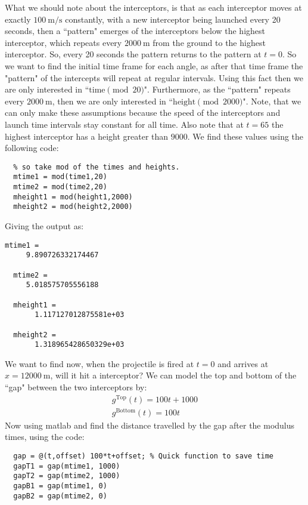 \documentclass[12pt]{article}
\begin{document}
What we should note about the interceptors, is that as each interceptor moves at exactly $\SI{100}{\meter\per\second}$ constantly, with a new interceptor being launched every 20 seconds, then a ``pattern" emerges of the interceptors below the highest interceptor, which repeats every $\SI{2000}{\meter}$ from the ground to the highest interceptor. So, every 20 seconds the pattern returns to the pattern at $t=0$. So we want to find the initial time frame for each angle, as after that time frame the "pattern" of the intercepts will repeat at regular intervals. Using this fact then we are only interested in ``$\text{time}\pmod{20}$". Furthermore, as the ``pattern" repeats every $\SI{2000}{\meter}$, then we are only interested in ``$\text{height}\pmod{2000}$". Note, that we can only make these assumptions because the speed of the interceptors and launch time intervals stay constant for all time. Also note that at $t=65$ the highest interceptor has a height greater than $9000$.  We find these values using the following code:
\begin{lstlisting}[title={Modulus of height and time}]
  % The pattern of interceptors reset every 20 seconds, and every 2000 meters
  % so take mod of the times and heights.
  mtime1 = mod(time1,20)
  mtime2 = mod(time2,20)
  mheight1 = mod(height1,2000)
  mheight2 = mod(height2,2000)
\end{lstlisting}
Giving the output as:
\begin{lstlisting}[title={Output of modulus}]
  mtime1 =
     9.890726332174467

  mtime2 =
     5.018575705556188

  mheight1 =
       1.117127012875581e+03

  mheight2 =
       1.318965428650329e+03
\end{lstlisting}
We want to find now, when the projectile is fired at $t=0$ and arrives at $x=\SI{12000}{\meter}$, will it hit a interceptor? We can model the top and bottom of the ``gap" between the two interceptors by:
\begin{gather*}
  g^\text{Top}(t) = 100t+1000 \\
  g^\text{Bottom}(t) = 100t
\end{gather*}
Now using matlab and find the distance travelled by the gap after the modulus times, using the code:
\begin{lstlisting}[title={Gap motion}]
  % Now calculate the positions of the "open interval" after m time.
  gap = @(t,offset) 100*t+offset; % Quick function to save time
  gapT1 = gap(mtime1, 1000)
  gapT2 = gap(mtime2, 1000)
  gapB1 = gap(mtime1, 0)
  gapB2 = gap(mtime2, 0)
\end{lstlisting}
\end{document}

